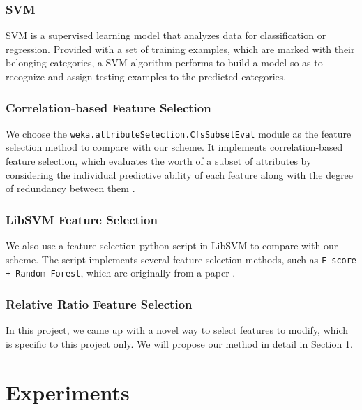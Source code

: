 \documentclass[11pt]{article}
\begin{document}
\subsubsection{SVM}
SVM \cite{cortes1995support} is a supervised learning model that analyzes data for classification or regression. Provided with a set of training examples, which are marked with their belonging categories, a SVM algorithm performs to build a model so as to recognize and assign testing examples to the predicted categories. 

\subsubsection{Correlation-based Feature Selection}
We choose the \texttt{weka.attributeSelection.CfsSubsetEval} module as the feature selection method to compare with our scheme. It implements correlation-based feature selection, which evaluates the worth of a subset of attributes by considering the individual predictive ability of each feature along with the degree of redundancy between them \cite{hall1999correlation}.

\subsubsection{LibSVM Feature Selection}
We also use a feature selection python script in LibSVM to compare with our scheme. The script implements several feature selection methods, such as \texttt{F-score + Random Forest}, which are originally from a paper \cite{chen2006combining}. 

\subsubsection{Relative Ratio Feature Selection}
In this project, we came up with a novel way to select features to modify, which is specific to this project only. We will propose our method in detail in Section \ref{sec:exp}.

\section{Experiments}\label{sec:exp}
\end{document}
